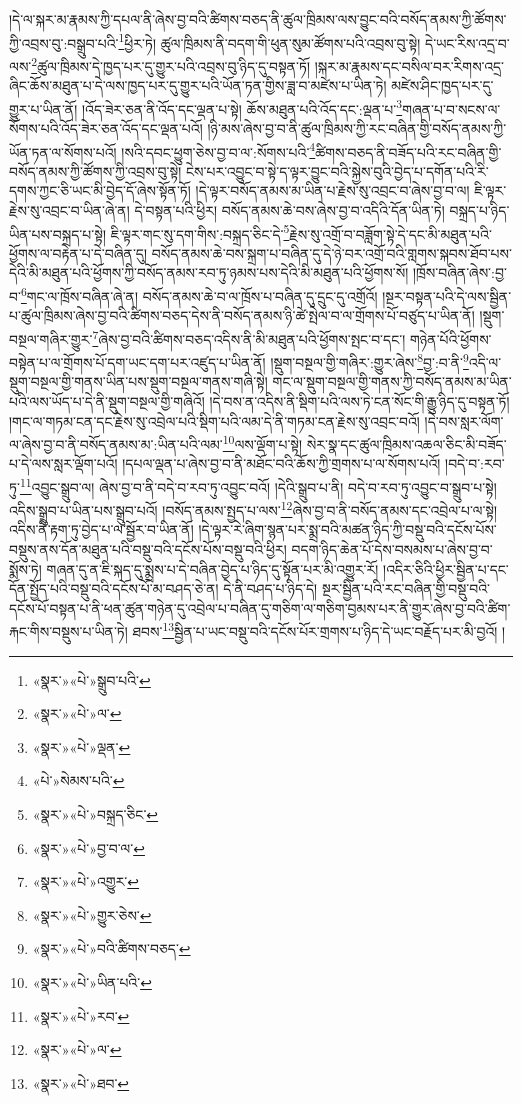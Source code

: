 །དེ་ལ་སྐར་མ་རྣམས་ཀྱི་དཔལ་ནི་ཞེས་བྱ་བའི་ཚིགས་བཅད་ནི་ཚུལ་ཁྲིམས་ལས་བྱུང་བའི་བསོད་ནམས་ཀྱི་ཚོགས་ཀྱི་འབྲས་བུ་:བསྒྲུབ་པའི་\footnote{«སྣར་»«པེ་»སྒྲུབ་པའི་}ཕྱིར་ཏེ། ཚུལ་ཁྲིམས་ནི་བདག་གི་ཕུན་སུམ་ཚོགས་པའི་འབྲས་བུ་སྟེ། དེ་ཡང་རིས་འདྲ་བ་ལས་\footnote{«སྣར་»«པེ་»ལ་}ཚུལ་ཁྲིམས་དེ་ཁྱད་པར་དུ་གྱུར་པའི་འབྲས་བུ་ཉིད་དུ་བསྟན་ཏོ། །སྐར་མ་རྣམས་དང་བསིལ་བར་རིགས་འདྲ་ཞིང་ཆོས་མཐུན་པ་དེ་ལས་ཁྱད་པར་དུ་གྱུར་པའི་ཡོན་ཏན་གྱིས་ཟླ་བ་མཛེས་པ་ཡིན་ཏེ། མཛེས་ཤིང་ཁྱད་པར་དུ་གྱུར་པ་ཡིན་ནོ། །འོད་ཟེར་ཅན་ནི་འོད་དང་ལྡན་པ་སྟེ། ཆོས་མཐུན་པའི་འོད་དང་:ལྡན་པ་\footnote{«སྣར་»«པེ་»ལྡན་}གཞན་པ་བ་སངས་ལ་སོགས་པའི་འོད་ཟེར་ཅན་འོད་དང་ལྡན་པའོ། །ཉི་མས་ཞེས་བྱ་བ་ནི་ཚུལ་ཁྲིམས་ཀྱི་རང་བཞིན་གྱི་བསོད་ནམས་ཀྱི་ཡོན་ཏན་ལ་སོགས་པའོ། །སའི་དབང་ཕྱུག་ཅེས་བྱ་བ་ལ་:སོགས་པའི་\footnote{«པེ་»སེམས་པའི་}ཚིགས་བཅད་ནི་བཟོད་པའི་རང་བཞིན་གྱི་བསོད་ནམས་ཀྱི་ཚོགས་ཀྱི་འབྲས་བུ་སྟེ། ངེས་པར་འབྱུང་བ་སྟེ་ད་ལྟར་བྱུང་བའི་སྐྱེས་བུའི་བྱེད་པ་དགོན་པའི་རི་དགས་ཀྱང་ཅི་ཡང་མི་བྱེད་དོ་ཞེས་སྟོན་ཏོ། །དེ་ལྟར་བསོད་ནམས་མ་ཡིན་པ་རྗེས་སུ་འབྲང་བ་ཞེས་བྱ་བ་ལ། ཇི་ལྟར་རྗེས་སུ་འབྲང་བ་ཡིན་ཞེ་ན། དེ་བསྟན་པའི་ཕྱིར། བསོད་ནམས་ཆེ་བས་ཞེས་བྱ་བ་འདིའི་དོན་ཡིན་ཏེ། བསྐྲད་པ་ཉིད་ཡིན་པས་བསྐྲད་པ་སྟེ། ཇི་ལྟར་གང་སུ་དག་གིས་:བསྐྲད་ཅིང་དེ་\footnote{«སྣར་»«པེ་»བསྐྲད་ཅིང་}རྗེས་སུ་འགྲོ་བ་བཟློག་སྟེ་དེ་དང་མི་མཐུན་པའི་ཕྱོགས་ལ་བརྟེན་པ་དེ་བཞིན་དུ། བསོད་ནམས་ཆེ་བས་སྐྲག་པ་བཞིན་དུ་དེ་ཉེ་བར་འགྲོ་བའི་གླགས་སྐབས་ཐོབ་པས་དེའི་མི་མཐུན་པའི་ཕྱོགས་ཀྱི་བསོད་ནམས་རབ་ཏུ་ཉམས་པས་དེའི་མི་མཐུན་པའི་ཕྱོགས་སོ། །ཁྲོས་བཞིན་ཞེས་:བྱ་བ་\footnote{«སྣར་»«པེ་»བྱ་བ་ལ་}གང་ལ་ཁྲོས་བཞིན་ཞེ་ན། བསོད་ནམས་ཆེ་བ་ལ་ཁྲོས་པ་བཞིན་དུ་དྲུང་དུ་འགྲོའོ། །སྔར་བསྟན་པའི་དེ་ལས་སྦྱིན་པ་ཚུལ་ཁྲིམས་ཞེས་བྱ་བའི་ཚིགས་བཅད་དེས་ནི་བསོད་ནམས་ཉི་ཚེ་སྤེལ་བ་ལ་གྲོགས་པོ་བཙུད་པ་ཡིན་ནོ། །སྡུག་བསྔལ་གཞིར་གྱུར་\footnote{«སྣར་»«པེ་»འགྱུར་}ཞེས་བྱ་བའི་ཚིགས་བཅད་འདིས་ནི་མི་མཐུན་པའི་ཕྱོགས་སྤང་བ་དང་། གཉེན་པོའི་ཕྱོགས་བསྟེན་པ་ལ་གྲོགས་པོ་དག་ཡང་དག་པར་འཛུད་པ་ཡིན་ནོ། །སྡུག་བསྔལ་གྱི་གཞིར་:གྱུར་ཞེས་\footnote{«སྣར་»«པེ་»གྱུར་ཅེས་}བྱ་:བ་ནི་\footnote{«སྣར་»«པེ་»བའི་ཚིགས་བཅད་}འདི་ལ་སྡུག་བསྔལ་གྱི་གནས་ཡིན་པས་སྡུག་བསྔལ་གནས་གཞི་སྟེ། གང་ལ་སྡུག་བསྔལ་གྱི་གནས་ཀྱི་བསོད་ནམས་མ་ཡིན་པའི་ལས་ཡོད་པ་དེ་ནི་སྡུག་བསྔལ་གྱི་གཞིའོ། །དེ་བས་ན་འདིས་ནི་སྡིག་པའི་ལས་ཏེ་ངན་སོང་གི་རྒྱུ་ཉིད་དུ་བསྟན་ཏོ། །གང་ལ་གཏམ་ངན་དང་རྗེས་སུ་འབྲེལ་པའི་སྡིག་པའི་ལམ་དེ་ནི་གཏམ་ངན་རྗེས་སུ་འབྲང་བའོ། །དེ་བས་སླར་ལོག་ལ་ཞེས་བྱ་བ་ནི་བསོད་ནམས་མ་:ཡིན་པའི་ལམ་\footnote{«སྣར་»«པེ་»ཡིན་པའི་}ལས་ལྡོག་པ་སྟེ། སེར་སྣ་དང་ཚུལ་ཁྲིམས་འཆལ་ཅིང་མི་བཟོད་པ་དེ་ལས་སླར་ལྡོག་པའོ། །དཔལ་ལྡན་པ་ཞེས་བྱ་བ་ནི་མཐོང་བའི་ཆོས་ཀྱི་གྲགས་པ་ལ་སོགས་པའོ། །བདེ་བ་:རབ་ཏུ་\footnote{«སྣར་»«པེ་»རབ་}འབྱུང་སྒྲུབ་ལ། ཞེས་བྱ་བ་ནི་བདེ་བ་རབ་ཏུ་འབྱུང་བའོ། །དེའི་སྒྲུབ་པ་ནི། བདེ་བ་རབ་ཏུ་འབྱུང་བ་སྒྲུབ་པ་སྟེ། འདིས་སྒྲུབ་པ་ཡིན་པས་སྒྲུབ་པའོ། །བསོད་ནམས་སྤྱད་པ་ལས་\footnote{«སྣར་»«པེ་»ལ་}ཞེས་བྱ་བ་ནི་བསོད་ནམས་དང་འབྲེལ་པ་ལ་སྟེ། འདིས་ནི་རྟག་ཏུ་བྱེད་པ་ལ་སྦྱོར་བ་ཡིན་ནོ། །དེ་ལྟར་རེ་ཞིག་སྙན་པར་སྨྲ་བའི་མཚན་ཉིད་ཀྱི་བསྡུ་བའི་དངོས་པོས་བསྡུས་ནས་དོན་མཐུན་པའི་བསྡུ་བའི་དངོས་པོས་བསྡུ་བའི་ཕྱིར། བདག་ཉིད་ཆེན་པོ་དེས་བསམས་པ་ཞེས་བྱ་བ་སྨོས་ཏེ། གཞན་དུ་ན་ཇི་སྐད་དུ་སྨྲས་པ་དེ་བཞིན་བྱེད་པ་ཉིད་དུ་སྟོན་པར་མི་འགྱུར་རོ། །འདིར་ཅིའི་ཕྱིར་སྦྱིན་པ་དང་དོན་སྤྱོད་པའི་བསྡུ་བའི་དངོས་པོ་མ་བཤད་ཅེ་ན། དེ་ནི་བཤད་པ་ཉིད་དེ། སྔར་སྦྱིན་པའི་རང་བཞིན་གྱི་བསྡུ་བའི་དངོས་པོ་བསྟན་པ་ནི་ཕན་ཚུན་གཉེན་དུ་འབྲེལ་པ་བཞིན་དུ་གཅིག་ལ་གཅིག་བྱམས་པར་ནི་གྱུར་ཞེས་བྱ་བའི་ཚིག་རྐང་གིས་བསྡུས་པ་ཡིན་ཏེ། ཐབས་\footnote{«སྣར་»«པེ་»ཐབ་}སྦྱིན་པ་ཡང་བསྡུ་བའི་དངོས་པོར་གྲགས་པ་ཉིད་དེ་ཡང་བརྗོད་པར་མི་བྱའོ། །
